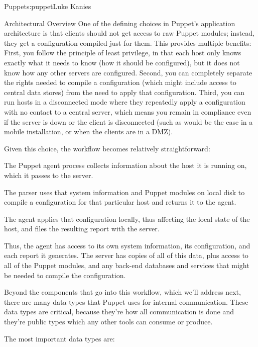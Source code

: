 \begin{aosachapter}{Puppet}{s:puppet}{Luke Kanies}
\begin{aosasect1}{Architectural Overview}
One of the defining choices in Puppet's application architecture is
that clients should not get access to raw Puppet modules; instead,
they get a configuration compiled just for them.  This provides
multiple benefits: First, you follow the principle of least privilege,
in that each host only knows exactly what it needs to know (how it
should be configured), but it does not know how any other servers are
configured.  Second, you can completely separate the rights needed to
compile a configuration (which might include access to central data
stores) from the need to apply that configuration.  Third, you can run
hosts in a disconnected mode where they repeatedly apply a
configuration with no contact to a central server, which means you
remain in compliance even if the server is down or the client is
disconnected (such as would be the case in a mobile installation, or
when the clients are in a DMZ).

Given this choice, the workflow becomes relatively straightforward:

\begin{aosaenumerate}

\item The Puppet agent process collects information about the host it
  is running on, which it passes to the server.

\item The parser uses that system information and Puppet modules on
  local disk to compile a configuration for that particular host and
  returns it to the agent.

\item The agent applies that configuration locally, thus affecting the
  local state of the host, and files the resulting report with the
  server.

\end{aosaenumerate}

Thus, the agent has access to its own system information, its
configuration, and each report it generates.  The server has copies of
all of this data, plus access to all of the Puppet modules, and any
back-end databases and services that might be needed to compile the
configuration.

Beyond the components that go into this workflow, which we'll address
next, there are many data types that Puppet uses for internal
communication. These data types are critical, because they're how all
communication is done and they're public types which any other tools
can consume or produce.

The most important data types are:


\end{aosasect1}
\end{aosachapter}
